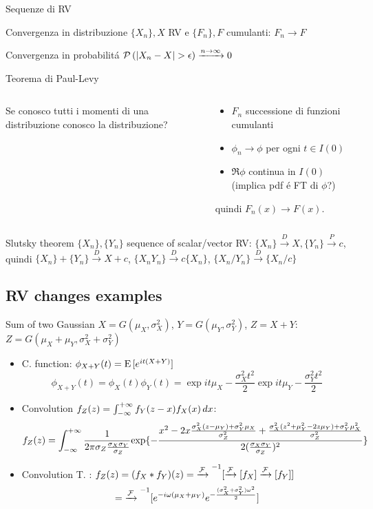 \documentclass[asd-beamer.tex]{subfiles}
\begin{document}
\begin{frame}{Sequenze di RV}\frameintoc
\begin{block}{Convergenza in distribuzione}
$\{X_n\}, X$ RV e $\{F_n\}, F$ cumulanti: $F_n\to F$
\end{block}
\begin{block}{Convergenza in probabilit\'a}
$\prob{(|X_n-X|>\epsilon)}\xrightarrow{n\to\infty}0$
\end{block}
\begin{block}{Teorema di Paul-Levy}
\begin{columns}[T]
	\begin{column}{0.3\textwidth}
		Se conosco tutti i momenti di una distribuzione conosco la distribuzione?
	\end{column}
	\begin{column}{0.7\textwidth}
		\begin{itemize}
			\item $F_n$ successione di funzioni cumulanti
			\item $\phi_n\to\phi$ per ogni $t\in I(0)$
			\item $\Re{\phi}$ continua in $I(0)$ (implica pdf \'e FT di $\phi$?)
		\end{itemize}
		quindi $F_n(x)\to F(x)$.
	\end{column}
\end{columns}
\end{block}
\begin{block}{Slutsky theorem}
$\{X_n\},\{Y_n\}$ sequence of scalar/vector RV: $\{X_n\}\xrightarrow{D}X,\{Y_n\}\xrightarrow{P}c$, quindi $\{X_n\}+\{Y_n\}\xrightarrow{D}X+c$, $\{X_nY_n\}\xrightarrow{D}c\{X_n\}$, $\{X_n/Y_n\}\xrightarrow{D}\{X_n/c\}$
\end{block}
\end{frame}

\subsection{RV changes examples}

\begin{frame}{Sum of two Gaussian}
$X=G(\mu_X,\sigma_X^2)$, $Y=G(\mu_Y,\sigma_Y^2)$, $Z=X+Y$: $Z=G(\mu_X+\mu_Y,\sigma_X^2+\sigma_Y^2)$
\begin{itemize}
\item C. function: $\phi_{X+Y}(t)=\operatorname{E}{[e^{it(X+Y)}]}$
\[\phi_{X+Y}(t)=\phi_X(t)\phi_Y(t)=\exp{it\mu_X-\frac{\sigma_X^2t^2}{2}}\exp{it\mu_Y-\frac{\sigma_Y^2t^2}{2}}\]
\item Convolution $f_Z(z)=\int_{-\infty}^{+\infty}{}f_Y(z-x)f_X(x)\,dx$:
\[f_Z(z)=\int_{-\infty}^{+\infty}{}\frac{1}{2\pi\sigma_Z\frac{\sigma_X\sigma_Y}{\sigma_Z}}\text{exp}\{-\frac{x^2-2x\frac{\sigma_X^2(z-\mu_Y)+\sigma_Y^2\mu_X}{\sigma_Z^2}+\frac{\sigma_X^2(z^2+\mu_Y^2-2z\mu_Y)+\sigma_Y^2\mu_X^2}{\sigma_Z^2}}{2(\frac{\sigma_X\sigma_Y}{\sigma_Z})^2}\}\]
\item Convolution T. : $f_Z(z)=(f_X*f_Y)(z)={\xrightarrow{\mathcal{F}}{}}^{-1}[\xrightarrow{\mathcal{F}}{[f_X]}\xrightarrow{\mathcal{F}}{[f_Y]}]$
\[={\xrightarrow{\mathcal{F}}{}}^{-1}[e^{-i\omega(\mu_X+\mu_Y)}e^{-\frac{(\sigma_X^2+\sigma_Y^2)\omega^2}{2}}]\]
\end{itemize}
\end{frame}
\end{document}

